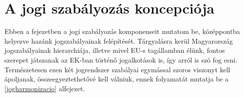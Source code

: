 \chapter{A jogi szabályozás koncepciója}

Ebben a fejezetben a jogi szabályozás komponenseit mutatom be, középpontba helyezve hazánk jogszabályainak felépítését. Tárgyalásra kerül Magyarország jogszabályainak hierarchiája, illetve mivel EU-s tagállamban élünk, fontos szerepet játszanak az EK-ban történő jogalkotások is, így arról is szó fog esni. Természetesen ezen két jogrendszer szabályai egymással szoros viszonyt kell ápoljanak, összeegyeztethetővé kell válniuk, ennek folyamatát mutatja be a \ref{jogharmonizacio} alfejezet.





